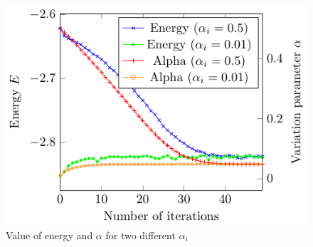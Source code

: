 \begin{figure}[th]
  \begin{center}
  \includegraphics[scale=1 ]{graphs/he-e-alpha-iterations.pdf}
  \caption{
	Value of energy and $\alpha$ for two different $\alpha_i$
  	}
  \label{fig:He_it}
  \end{center}
\end{figure}
